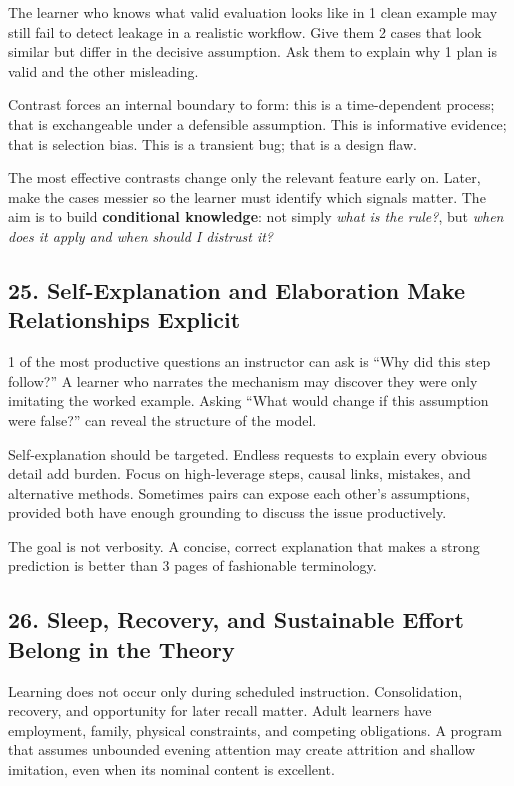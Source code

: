 The learner who knows what valid evaluation looks like in 1 clean example may still fail to detect leakage in a realistic workflow. Give them 2 cases that look similar but differ in the decisive assumption. Ask them to explain why 1 plan is valid and the other misleading.

Contrast forces an internal boundary to form: this is a time-dependent process; that is exchangeable under a defensible assumption. This is informative evidence; that is selection bias. This is a transient bug; that is a design flaw.

The most effective contrasts change only the relevant feature early on. Later, make the cases messier so the learner must identify which signals matter. The aim is to build \textbf{conditional knowledge}: not simply \emph{what is the rule?}, but \emph{when does it apply and when should I distrust it?}

\subsection*{25. Self-Explanation and Elaboration Make Relationships Explicit}

1 of the most productive questions an instructor can ask is ``Why did this step follow?'' A learner who narrates the mechanism may discover they were only imitating the worked example. Asking ``What would change if this assumption were false?'' can reveal the structure of the model.

Self-explanation should be targeted. Endless requests to explain every obvious detail add burden. Focus on high-leverage steps, causal links, mistakes, and alternative methods. Sometimes pairs can expose each other's assumptions, provided both have enough grounding to discuss the issue productively.

The goal is not verbosity. A concise, correct explanation that makes a strong prediction is better than 3 pages of fashionable terminology.

\subsection*{26. Sleep, Recovery, and Sustainable Effort Belong in the Theory}

Learning does not occur only during scheduled instruction. Consolidation, recovery, and opportunity for later recall matter. Adult learners have employment, family, physical constraints, and competing obligations. A program that assumes unbounded evening attention may create attrition and shallow imitation, even when its nominal content is excellent.

